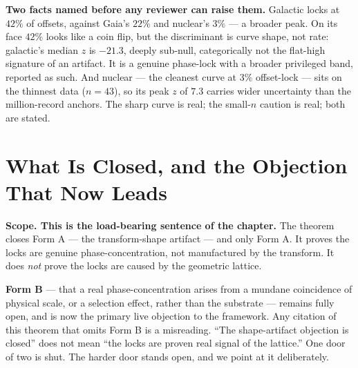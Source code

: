 \documentclass[11pt, letterpaper, openany]{book}
\begin{document}
\begin{signalbox}
\textbf{Two facts named before any reviewer can raise them.} Galactic locks at $42\%$ of
offsets, against Gaia's $22\%$ and nuclear's $3\%$ --- a broader peak. On its face $42\%$
looks like a coin flip, but the discriminant is curve shape, not rate: galactic's median
$z$ is $-21.3$, deeply sub-null, categorically not the flat-high signature of an artifact.
It is a genuine phase-lock with a broader privileged band, reported as such. And nuclear ---
the cleanest curve at $3\%$ offset-lock --- sits on the thinnest data ($n=43$), so its peak
$z$ of $7.3$ carries wider uncertainty than the million-record anchors. The sharp curve is
real; the small-$n$ caution is real; both are stated.
\end{signalbox}
 
\section{What Is Closed, and the Objection That Now Leads}
 
\begin{warningbox}
\textbf{Scope. This is the load-bearing sentence of the chapter.} The theorem closes Form A
--- the transform-shape artifact --- and only Form A. It proves the locks are genuine
phase-concentration, not manufactured by the transform. It does \emph{not} prove the locks
are caused by the geometric lattice.
 
\textbf{Form B} --- that a real phase-concentration arises from a mundane coincidence of
physical scale, or a selection effect, rather than the substrate --- remains fully open, and
is now the primary live objection to the framework. Any citation of this theorem that omits
Form B is a misreading. ``The shape-artifact objection is closed'' does not mean ``the locks
are proven real signal of the lattice.'' One door of two is shut. The harder door stands
open, and we point at it deliberately.
\end{warningbox}
 
\end{document}
